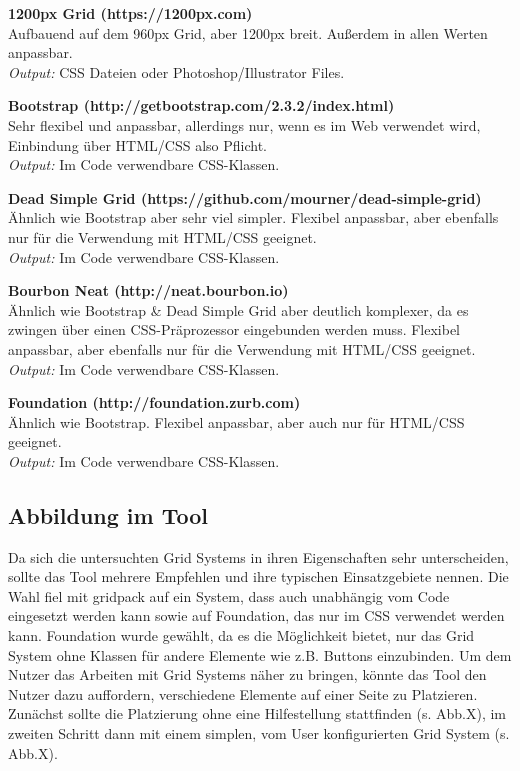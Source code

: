 \textbf{1200px Grid (https://1200px.com)} \\
Aufbauend auf dem 960px Grid, aber 1200px breit. Außerdem in allen Werten anpassbar. \\
\textit{Output:} CSS Dateien oder Photoshop/Illustrator Files.

\textbf{Bootstrap (http://getbootstrap.com/2.3.2/index.html)} \\
Sehr flexibel und anpassbar, allerdings nur, wenn es im Web verwendet wird, Einbindung über HTML/CSS also Pflicht. \\
\textit{Output:} Im Code verwendbare CSS-Klassen.

\textbf{Dead Simple Grid (https://github.com/mourner/dead-simple-grid)} \\
Ähnlich wie Bootstrap aber sehr viel simpler. Flexibel anpassbar, aber ebenfalls nur für die Verwendung mit HTML/CSS geeignet. \\
\textit{Output:} Im Code verwendbare CSS-Klassen.

\textbf{Bourbon Neat (http://neat.bourbon.io)} \\
Ähnlich wie Bootstrap \& Dead Simple Grid aber deutlich komplexer, da es zwingen über einen CSS-Präprozessor eingebunden werden muss. Flexibel anpassbar, aber ebenfalls nur für die Verwendung mit HTML/CSS geeignet. \\
\textit{Output:} Im Code verwendbare CSS-Klassen.

\textbf{Foundation (http://foundation.zurb.com)} \\
Ähnlich wie Bootstrap. Flexibel anpassbar, aber auch nur für HTML/CSS geeignet. \\
\textit{Output:} Im Code verwendbare CSS-Klassen.

\subsection{Abbildung im Tool}
Da sich die untersuchten Grid Systems in ihren Eigenschaften sehr unterscheiden, sollte das Tool mehrere Empfehlen und ihre typischen Einsatzgebiete nennen.
Die Wahl fiel mit gridpack auf ein System, dass auch unabhängig vom Code eingesetzt werden kann sowie auf Foundation, das nur im CSS verwendet werden kann. Foundation wurde gewählt, da es die Möglichkeit bietet, nur das Grid System ohne Klassen für andere Elemente wie z.B. Buttons einzubinden.
Um dem Nutzer das Arbeiten mit Grid Systems näher zu bringen, könnte das Tool den Nutzer dazu auffordern, verschiedene Elemente auf einer Seite zu Platzieren. Zunächst sollte die Platzierung ohne eine Hilfestellung stattfinden (s. Abb.X), im zweiten Schritt dann mit einem simplen, vom User konfigurierten Grid System (s. Abb.X).

